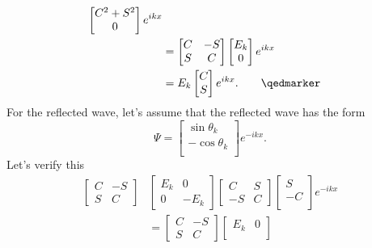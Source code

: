 {\begin{equation}
\begin{aligned}
\begin{bmatrix}
C^2 + S^2 \\
0 \\
\end{bmatrix}
e^{i k x}
\\ &=
\begin{bmatrix}
C & - S \\
S & C
\end{bmatrix}
\begin{bmatrix}
E_k \\
0
\end{bmatrix}
e^{i k x}
\\ &=
E_k
\begin{bmatrix}
C \\
S
\end{bmatrix}
e^{i k x}. \qquad \qedmarker
\end{aligned}
\end{equation}
%
%
For the reflected wave, let's assume that the reflected wave has the form
%
\begin{equation}\label{eqn:qmLecture9Problems:680}
\Psi =
\begin{bmatrix}
\sin\theta_k \\
-\cos\theta_k \\
\end{bmatrix}
e^{-i k x }.
\end{equation}
%
Let's verify this
%
\begin{equation}\label{eqn:qmLecture9Problems:700}
\begin{aligned}
\begin{bmatrix}
C & - S \\
S & C
\end{bmatrix}
&\begin{bmatrix}
E_k & 0 \\
0 & -E_k
\end{bmatrix}
\begin{bmatrix}
C & S \\
-S & C
\end{bmatrix}
\begin{bmatrix}
S \\
-C \\
\end{bmatrix}
e^{-i k x} \\
&=
\begin{bmatrix}
C & - S \\
S & C
\end{bmatrix}
\begin{bmatrix}
E_k & 0 \\

\end{bmatrix}
\end{aligned}
\end{equation}}
